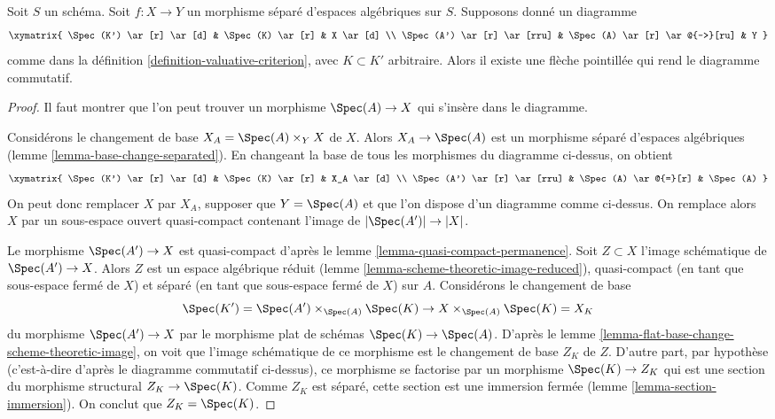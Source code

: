 \begin{lemma}
\label{lemma-push-down-solution}
Soit $S$ un schéma. Soit $f : X \to Y$ un morphisme séparé d'espaces
algébriques sur $S$. Supposons donné un diagramme
$$
\xymatrix{
\Spec(K') \ar[r] \ar[d] & \Spec(K) \ar[r] & X \ar[d] \\
\Spec(A') \ar[r] \ar[rru] & \Spec(A) \ar[r] \ar@{-->}[ru] & Y
}
$$
comme dans la définition \ref{definition-valuative-criterion}, avec $K \subset K'$
arbitraire. Alors il existe une flèche pointillée qui rend le diagramme commutatif.
\end{lemma}

\begin{proof}
Il faut montrer que l'on peut trouver un morphisme $\Spec(A) \to X$ qui s'insère
dans le diagramme.

\medskip\noindent
Considérons le changement de base $X_A = \Spec(A) \times_Y X$ de $X$.
Alors $X_A \to \Spec(A)$ est un morphisme séparé d'espaces
algébriques (lemme \ref{lemma-base-change-separated}). En changeant la base de
tous les morphismes du diagramme ci-dessus, on obtient
$$
\xymatrix{
\Spec(K') \ar[r] \ar[d] & \Spec(K) \ar[r] & X_A \ar[d] \\
\Spec(A') \ar[r] \ar[rru] & \Spec(A) \ar@{=}[r] & \Spec(A)
}
$$
On peut donc remplacer $X$ par $X_A$, supposer que $Y = \Spec(A)$ et
que l'on dispose d'un diagramme comme ci-dessus. On remplace alors $X$ par
un sous-espace ouvert quasi-compact contenant l'image de $|\Spec(A')| \to |X|$.

\medskip\noindent
Le morphisme $\Spec(A') \to X$ est quasi-compact d'après le
lemme \ref{lemma-quasi-compact-permanence}.
Soit $Z \subset X$ l'image schématique de
$\Spec(A') \to X$. Alors $Z$ est un espace algébrique réduit
(lemme \ref{lemma-scheme-theoretic-image-reduced}),
quasi-compact (en tant que sous-espace fermé de $X$) et séparé
(en tant que sous-espace fermé de $X$) sur $A$.
Considérons le changement de base
$$
\Spec(K') = \Spec(A') \times_{\Spec(A)} \Spec(K) \to
X \times_{\Spec(A)} \Spec(K) = X_K
$$
du morphisme $\Spec(A') \to X$ par le morphisme plat de schémas
$\Spec(K) \to \Spec(A)$. D'après le
lemme \ref{lemma-flat-base-change-scheme-theoretic-image},
on voit que l'image schématique de ce morphisme
est le changement de base $Z_K$ de $Z$. D'autre part, par
hypothèse (c'est-à-dire d'après le diagramme commutatif ci-dessus),
ce morphisme se factorise par un morphisme
$\Spec(K) \to Z_K$ qui est une section du morphisme structural
$Z_K \to \Spec(K)$. Comme $Z_K$ est séparé, cette section est une
immersion fermée (lemme \ref{lemma-section-immersion}).
On conclut que $Z_K = \Spec(K)$.


\end{proof}
